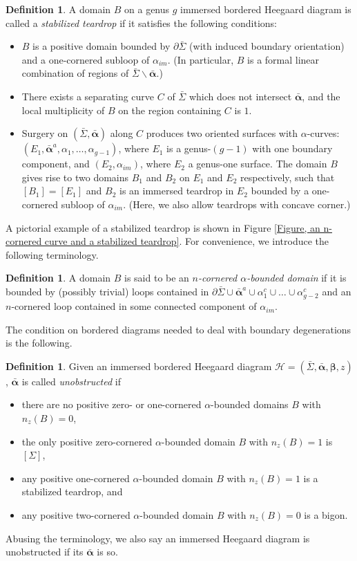 \documentclass{amsart}
\theoremstyle{definition}
\newtheorem{defn}[thm]{Definition}
\theoremstyle{remark}
\numberwithin{equation}{section}
\numberwithin{equation}{section} \makeatletter
\begin{document}
\begin{defn}
A domain $B$ on a genus $g$ immersed bordered Heegaard diagram is called a \emph{stabilized teardrop} if it satisfies the following conditions:
\begin{itemize}
\item[(1)]$B$ is a positive domain bounded by $\partial\bar{\Sigma}$ (with induced boundary orientation) and a one-cornered subloop of $\alpha_{im}$. (In particular, $B$ is a formal linear combination of regions of $\bar{\Sigma}\backslash\bm{\bar{\alpha}}$.)
\item[(2)]There exists a separating curve $C$ of $\bar{\Sigma}$ which does not intersect $\bm{\bar{\alpha}}$, and the local multiplicity of $B$ on the region containing $C$ is $1$. 
\item[(3)]Surgery on $(\bar{\Sigma},\bm{\bar{\alpha}})$ along $C$ produces two oriented surfaces with $\alpha$-curves: $(E_1,\bar{\bm{\alpha}}^a,\alpha_1,\ldots,\alpha_{g-1})$,  where $E_1$ is a genus-$(g-1)$ with one boundary component, and $(E_2,\alpha_{im})$, where $E_2$ a genus-one surface. The domain $B$ gives rise to two domains $B_1$ and $B_2$ on $E_1$ and $E_2$ respectively, such that $[B_1]=[E_1]$ and $B_2$ is an immersed teardrop in $E_2$ bounded by a one-cornered subloop of $\alpha_{im}$. (Here, we also allow teardrops with concave corner.)
\end{itemize}
\end{defn}
A pictorial example of a stabilized teardrop is shown in Figure \ref{Figure, an n-cornered curve and a stabilized teardrop}. For convenience, we introduce the following terminology.
\begin{defn}
A domain $B$ is said to be an \emph{$n$-cornered $\alpha$-bounded domain} if it is bounded by (possibly trivial) loops contained in $\partial\bar{\Sigma}\cup \bar{\bm{\alpha}}^a\cup \alpha_{1}^c\cup\ldots\cup \alpha_{g-2}^c$ and an $n$-cornered loop contained in some connected component of $\alpha_{im}$. 
\end{defn}
The condition on bordered diagrams needed to deal with boundary degenerations is the following. 
\begin{defn}\label{Definition, unobstructedness}
Given an immersed bordered Heegaard diagram $\mathcal{H}=(\bar{\Sigma},\bm{\bar{\alpha}},\bm{\beta},z)$, $\bm{\bar{\alpha}}$ is called \emph{unobstructed} if 
\begin{itemize}
\item[(1)]there are no positive zero- or one-cornered $\alpha$-bounded domains $B$ with $n_z(B)=0$, 
\item[(2)]the only positive zero-cornered $\alpha$-bounded domain $B$ with $n_z(B)=1$ is $[\Sigma]$,
\item[(3)]any positive one-cornered $\alpha$-bounded domain $B$ with $n_z(B)=1$ is a stabilized teardrop, and
\item[(4)]any positive two-cornered $\alpha$-bounded domain $B$ with $n_z(B)=0$ is a bigon.
\end{itemize}
Abusing the terminology, we also say an immersed Heegaard diagram is unobstructed if its $\bm{\bar{\alpha}}$ is so.
\end{defn} 
\end{document}
